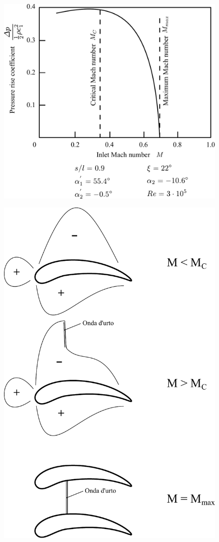 \begin{figure}
\centering
\begin{minipage}{.6\textwidth}
  \centering
  \includegraphics[width=.95\linewidth]{fig/FuoriProg2.pdf}
  \label{fig:FuoriProg2}
\end{minipage}%
\begin{minipage}{.4\textwidth}
  \centering
  \includegraphics[width=.95\linewidth]{fig/FuoriProgMach.pdf}

\end{minipage}
\end{figure}

